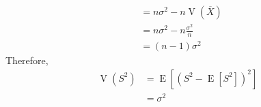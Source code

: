 \documentclass[titlepage, fleqn, a4paper, 12pt, twoside]{article}
\theoremstyle{definition}
\theoremstyle{theorem}
\DeclareMathOperator{\expct}{\mathrm{E}}
\DeclareMathOperator{\var}{\mathrm{V}}
\begin{document}
\begin{solution}
\begin{align*}
                                                 & = n \sigma^2 - n \var\left( \overline{X} \right)                                                                          \\
                                                 & = n \sigma^2 - n \frac{\sigma^2}{n}                                                                                       \\
                                                 & = (n - 1) \sigma^2
	\end{align*}
	Therefore,
	\begin{align*}
		\var\left( S^2 \right) & = \expct\left[ \left( S^2 - \expct\left[ S^2 \right] \right)^2 \right] \\
                                       & = \sigma^2
	\end{align*}
\end{solution}
\end{document}

